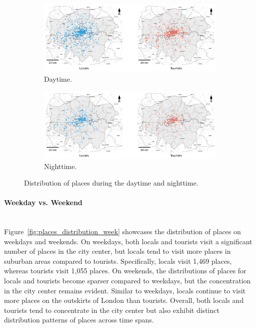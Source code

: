 \documentclass{article}
\newcommand{\subsubsubsection}[1]{\paragraph{#1}\mbox{}\\}
\theoremstyle{remark}
\begin{document}
\begin{figure}[!h]

\centering
\begin{subfigure}{0.6\textheight}
\centering
\includegraphics[width=0.9\linewidth]{figures/places_daytime.png} 
\caption{Daytime.}
\label{fig:places_daytime}
\end{subfigure}
\begin{subfigure}{0.6\textheight}
\centering
\includegraphics[width=0.9\linewidth]{figures/places_nighttime.png}
\caption{Nighttime.}
\label{fig:places_nighttime}
\end{subfigure}

\caption{Distribution of places during the daytime and nighttime.}
\label{fig:places_distribution_day}
\end{figure}


\subsubsubsection{Weekday vs. Weekend}
Figure~\ref{fig:places_distribution_week} showcases the distribution of places on weekdays and weekends. On weekdays, both locals and tourists visit a significant number of places in the city center, but locals tend to visit more places in suburban areas compared to tourists. Specifically, locals visit 1,469 places, whereas tourists visit 1,055 places. On weekends, the distributions of places for locals and tourists become sparser compared to weekdays, but the concentration in the city center remains evident. Similar to weekdays, locals continue to visit more places on the outskirts of London than tourists. Overall, both locals and tourists tend to concentrate in the city center but also exhibit distinct distribution patterns of places across time spans.
\end{document}
